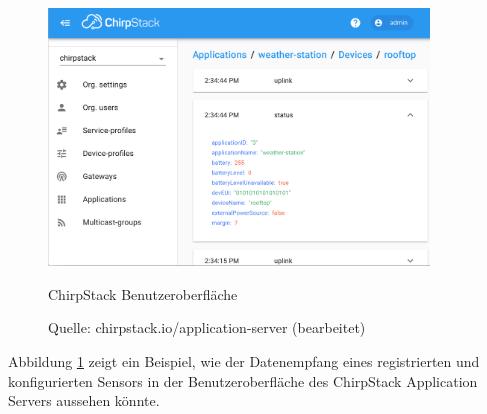 \begin{figure}[H]
  \vspace{10pt}
  \begin{center}
    \includegraphics[width=0.9\textwidth]{./images/chirpstack-ui.png}
  \end{center}
  \vspace{-5pt}
  \caption[ChirpStack Benutzeroberfläche]{ChirpStack Benutzeroberfläche}
  \caption*{Quelle: {chirpstack.io/application-server (bearbeitet)}}
  \label{fig:chirpstack-ui}
  \vspace{-10pt}
\end{figure}

Abbildung \ref{fig:chirpstack-ui} zeigt ein Beispiel, wie der Datenempfang eines registrierten und konfigurierten Sensors in der Benutzeroberfläche des ChirpStack Application Servers aussehen könnte. 

